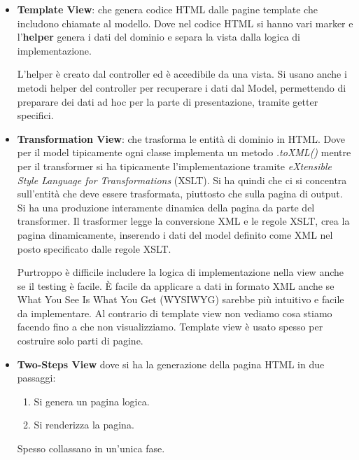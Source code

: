\begin{itemize}
      \item \textbf{Template View}: che genera codice HTML dalle pagine template
            che includono chiamate al modello. Dove nel codice HTML si hanno vari
            marker e l'\textbf{helper} genera i dati del dominio e separa la vista
            dalla logica di implementazione.

            L'helper è creato dal controller ed è accedibile da una vista. Si usano
            anche i metodi helper del controller per recuperare i dati dal Model,
            permettendo di preparare dei dati ad hoc per la parte di presentazione,
            tramite getter specifici.
      \item \textbf{Transformation View}: che trasforma le entità di dominio in
            HTML. Dove per il model tipicamente ogni classe implementa un metodo
            \textit{.toXML()} mentre per il transformer si ha tipicamente
            l'implementazione tramite \textit{eXtensible Style Language for
                  Transformations} (XSLT). Si ha quindi che ci si concentra
            sull'entità che deve essere trasformata, piuttosto che sulla pagina
            di output. Si ha una produzione interamente dinamica della pagina da
            parte del transformer. Il trasformer legge la conversione XML e le
            regole XSLT, crea la pagina dinamicamente, inserendo i dati del model
            definito come XML nel posto specificato dalle regole XSLT.

            Purtroppo è difficile includere la logica di implementazione nella view
            anche se il testing è facile. È facile da applicare a dati in formato
            XML anche se What You See Is What You Get (WYSIWYG) sarebbe più intuitivo
            e facile da implementare. Al contrario di template view non vediamo
            cosa stiamo facendo fino a che non visualizziamo. Template view è usato
            spesso per costruire solo parti di pagine.
      \item \textbf{Two-Steps View} dove si ha la generazione della pagina HTML
            in due passaggi:
            \begin{enumerate}
                  \item Si genera un pagina logica.
                  \item Si renderizza la pagina.
            \end{enumerate}
            Spesso collassano in un'unica fase.


\end{itemize}

